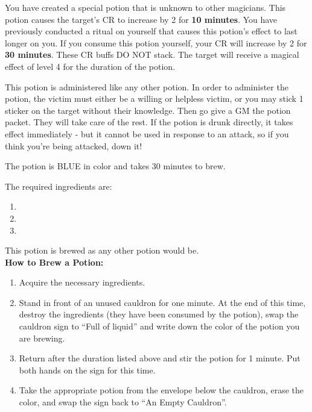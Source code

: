 \documentclass[green]{NeptuneBall}
\begin{document}
\name{\gBuff{}}

You have created a special potion that is unknown to other magicians. This potion causes the target's CR to increase by 2 for {\bf 10 minutes}.  You have previously conducted a ritual on yourself that causes this potion's effect to last longer on you. If you consume this potion yourself, your CR will increase by 2 for {\bf 30 minutes}. These CR buffs DO NOT stack. The target will receive a magical effect of level 4 for the duration of the potion.

This potion is administered like any other potion. In order to administer the potion, the victim must either be a willing or helpless victim, or you may stick 1 sticker on the target without their knowledge. Then go give a GM the potion packet. They will take care of the rest. If the potion is drunk directly, it takes effect immediately - but it cannot be used in response to an attack, so if you think you're being attacked, down it!

The potion is BLUE in color and takes 30 minutes to brew. 

The required ingredients are:
\begin{enumerate}
\item \iManOfWar{}
\item \iTeeth{}
\item \iSwordfish{}
\end{enumerate}

This potion is brewed as any other potion would be.\\

{\bf How to Brew a Potion:}\\ %
\begin{enumerate}
  \item Acquire the necessary ingredients.
  \item Stand in front of an unused cauldron for one minute. At the end of this time, destroy the ingredients (they have been consumed by the potion), swap the cauldron sign to ``Full of liquid'' and write down the color of the potion you are brewing.
  \item Return after the duration listed above and stir the potion for 1 minute. Put both hands on the sign for this time.
  \item Take the appropriate potion from the envelope below the cauldron, erase the color, and swap the sign back to ``An Empty Cauldron''.
\end{enumerate}
\end{document}
